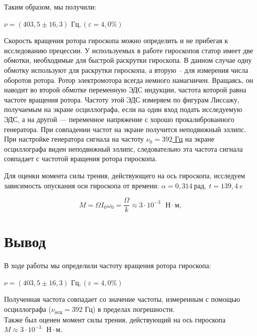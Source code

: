 \documentclass[a4paper, 12pt]{article}
\begin{document}
\begin{center}
Таким образом, мы получили:

\bigskip
	 \underline{$ \nu = \left( 403,5 \pm 16,3 \right) \text{ Гц}, \left( 
      \varepsilon = 4,0 \% \right) $}

\bigskip
Скорость вращения ротора гироскопа можно определить и не прибегая к исследованию прецессии. У используемых в работе гироскопов статор имеет две обмотки, необходимые для быстрой раскрутки гироскопа. В данном случае одну обмотку используют для раскрутки гироскопа, а вторую -- для измерения числа оборотов ротора. Ротор электромотора всегда немного намагничен. Вращаясь, он наводит во второй обмотке переменную ЭДС индукции, частота которой равна частоте вращения ротора. Частоту этой ЭДС измеряем по фигурам Лиссажу, получаемым на экране осциллографа, если на один вход подать исследуемую ЭДС, а на другой — переменное напряжение с хорошо прокалиброванного генератора. При совпадении частот на экране получится неподвижный эллипс.\\
При настройке генератора сигнала на частоту \underline{$ \nu_0 = 392$ Гц} на экране осциллографа виден  неподвижный эллипс, следовательно эта частота сигнала совпадает с частотой вращения ротора гироскопа.


Для оценки момента силы трения, действующего на ось гироскопа, исследуем зависимость опускания оси гироскопа от времени:  $\alpha = 0,314 \ \text{рад}, \ t = 139,4 \ \text{c} $ 

\begin{equation}
M = \Omega I_0\omega_0 = \frac{\Omega}{k} \approx 3 \cdot 10^{-3} \text{ } \text{Н} \cdot \text{м},
\end{equation}

\section*{Вывод}
В ходе работы мы определили частоту вращения ротора гироскопа:

\bigskip
	$ \nu = \left( 403,5 \pm 16,3 \right) \text{ Гц}, \left( \varepsilon = 4,0 \% \right)   $
\bigskip

Полученная частота совпадает со значение частоты, измеренным с помощью осциллографа ($ \nu_\text{осц} = 392 $ Гц) в пределах погрешности.\\
Также был оценен момент силы трения, действующий на ось гироскопа $ M \approx 3 \cdot 10^{-3} \text{ } \text{Н} \cdot \text{м} $.

  
\end{center}
\end{document}
